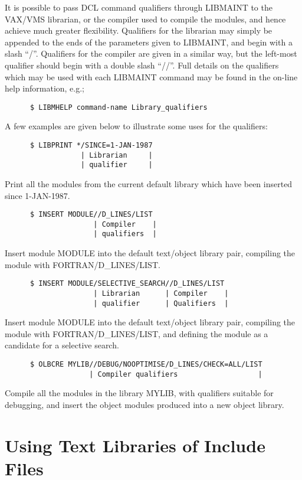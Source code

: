 It is possible to pass DCL command qualifiers through LIBMAINT
to the VAX/VMS librarian, or the compiler used to compile the
modules, and hence achieve much greater flexibility.
Qualifiers for the librarian may simply be appended
to the ends of the parameters given to LIBMAINT, and begin
with a slash ``/''.
Qualifiers for the compiler are given in a similar way,
but the left-most qualifier should begin with a double slash
``//''.
Full details on the qualifiers which may be used with
each LIBMAINT command may be found in the on-line help
information, e.g.;
\begin{verbatim}
      $ LIBMHELP command-name Library_qualifiers
\end{verbatim}
A few examples are given below to illustrate some
uses for the qualifiers:
\begin{verbatim}
      $ LIBPRINT */SINCE=1-JAN-1987
                  | Librarian     |
                  | qualifier     |
\end{verbatim}
Print all the modules from the current default library which
have been inserted since 1-JAN-1987.
\begin{verbatim}
      $ INSERT MODULE//D_LINES/LIST
                     | Compiler    |
                     | qualifiers  |
\end{verbatim}
Insert module MODULE into the default text/object library pair,
compiling the module with FORTRAN/D\_LINES/LIST.
\begin{verbatim}
      $ INSERT MODULE/SELECTIVE_SEARCH//D_LINES/LIST
                     | Librarian      | Compiler    |
                     | qualifier      | Qualifiers  |
\end{verbatim}
Insert module MODULE into the default text/object library pair,
compiling the module with FORTRAN/D\_LINES/LIST, and defining
the module as a candidate for a selective search.
\begin{verbatim}
      $ OLBCRE MYLIB//DEBUG/NOOPTIMISE/D_LINES/CHECK=ALL/LIST
                    | Compiler qualifiers                   |
\end{verbatim}
Compile all the modules in the library MYLIB, with qualifiers suitable
for debugging, and insert the object modules produced into a new object
library.

\section{Using Text Libraries of Include Files} 

